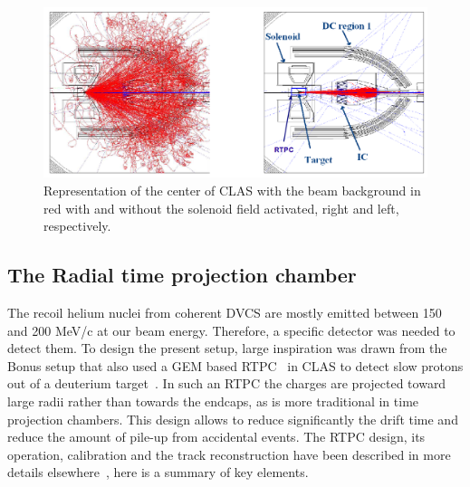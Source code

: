 \documentclass[aps,prc,preprint,superscriptaddress]{revtex4}
\begin{document}
\begin{figure}[tbp!]
\center
\includegraphics[width=14cm]{fig3/solenoid.png}
\caption{Representation of the center of CLAS with the beam background in red with and without
	the solenoid field activated, right and left, respectively.}
\label{fig:Solenoid}
\end{figure}


\subsection{The Radial time projection chamber}

The recoil helium nuclei from coherent DVCS are mostly emitted between 150 
and 200 MeV/c at our beam energy. Therefore, a specific detector was 
needed to detect them. To design the present setup, large inspiration was drawn from the 
Bonus setup that also used a GEM based RTPC~\cite{Fenker:2008zz} in CLAS to 
detect slow protons out of a deuterium target~\cite{Baillie:2011za}. In such an RTPC the 
charges are projected toward large radii 
rather than towards the endcaps, as is more traditional in time 
projection chambers. This design allows to reduce significantly the drift time and reduce the 
amount of pile-up from accidental events. The RTPC design, its operation, calibration and 
the track reconstruction have been described in more 
details elsewhere~\cite{Dupre:2017upj}, here is a summary of key elements.
\end{document}
